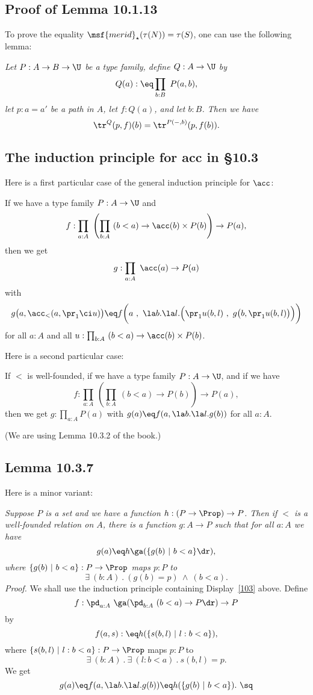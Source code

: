 \documentclass[12pt]{article}
\begin{document}
\subsection{Proof of Lemma 10.1.13}

To prove the equality $\msf{merid}_\star(\tau(N))=\tau(S)$, one can use the following lemma:

\emph{Let $P:A\to B\to\U$ be a type family, define $Q:A\to\U$ by 
$$
Q(a):\eq\prod_{b:B}\ P(a,b),
$$ 
let $p:a=a'$ be a path in $A$, let $f:Q(a)$, and let $b:B$. Then we have} 
$$
\tr^Q(p,f)(b)=\tr^{P(-,b)}(p,f(b)).
$$


\subsection{The induction principle for \textsf{acc} in \S10.3}

Here is a first particular case of the general induction principle for $\acc$:

If we have a type family $P:A\to\U$ and %
$$
f:\prod_{a:A}\ \left(\prod_{b:A}\ (b<a)\to\acc(b)\times P(b)\right)\to P(a),%
$$ 
then we get 
$$
g:\prod_{a:A}\ \acc(a)\to P(a)
$$
with
$$
g\big(a,\acc_<(a,\pr_1\ci u)\big)\eq f\bigg(a\ ,\ \la b.\la l.\Big(\pr_1 u(b,l)\ ,\ g\big(b,\pr_1 u(b,l)\big)\Big)\bigg)
$$
for all $a:A$ and all $u:\prod_{b:A}\ (b<a)\to\acc(b)\times P(b)$. 

Here is a second particular case:

If $<$ is well-founded, if we have a type family $P:A\to\U$, and if we have 
\begin{equation}\label{103}
f:\prod_{a:A}\ \left(\prod_{b:A}\ (b<a)\to P(b)\right)\to P(a),
\end{equation} 
then we get $g:\prod_{a:A}P(a)$ with $g(a)\eq f(a,\la b.\la l.g(b))$ for all $a:A$.

(We are using Lemma 10.3.2 of the book.)


\subsection{Lemma 10.3.7}%

Here is a minor variant:

\nn\emph{Suppose $P$ is a set and we have a function $h:(P\to\Prop)\to P$. Then if $<$ is a well-founded relation on $A$, there is a function $g:A\to P$ such that for all $a:A$ we have} 
$$
g(a)\eq h\ga(\{g(b)\ \vert\ b<a\}\dr),
$$ 
\emph{where $\{g(b)\ \vert\ b<a\}:P\to\Prop$ maps $p:P$ to} 
$$
\exists\ (b:A)\ .\ (g(b)=p)\ \wedge\ (b<a).
$$ 
\emph{Proof.} We shall use the induction principle containing Display~\eqref{103} above. Define 
$$
f:\pd_{a:A}\ \ga(\pd_{b:A}\ (b<a)\to P\dr)\to P
$$ 
by 
$$
f(a,s):\eq h(\{s(b,l)\ \vert\ l:b<a\}),
$$ 
where $\{s(b,l)\ \vert\ l:b<a\}:P\to\Prop$ maps $p:P$ to 
$$
\exists\ (b:A)\ .\ \exists\ (l:b<a)\ .\ s(b,l)=p.
$$ 
We get 
$$
g(a)\eq f(a,\la b.\la l.g(b))\eq h(\{g(b)\ \vert\ b<a\}).\ \sq
$$ 
\end{document}
